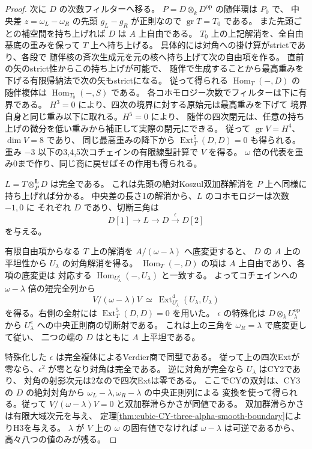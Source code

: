 \begin{proof}
次に $D$ の次数フィルターへ移る。
$P=D\otimes_k D^{\mathrm{op}}$ の随伴環は $P_0$ で、
中央差 $z=\omega_L-\omega_R$ の先頭 $g_L-g_R$ が正則なので
$\operatorname{gr}T=T_0$ である。
また先頭ごとの補空間を持ち上げれば $D$ は $A$ 上自由である。
$T_0$ 上の上記解消を、全自由基底の重みを保って $T$ 上へ持ち上げる。
具体的には対角への掛け算がstrictであり、各段で
随伴核の斉次生成元を元の核へ持ち上げて次の自由項を作る。
直前の矢のstrict性からこの持ち上げが可能で、
随伴で生成することから最高重みを下げる有限帰納法で次の矢もstrictになる。
従って得られる $\operatorname{Hom}_T(-,D)$ の随伴複体は
$\operatorname{Hom}_{T_0}(-,S)$ である。
各コホモロジー次数でフィルターは下に有界である。
$H^3=0$ により、四次の境界に対する原始元は最高重みを下げて
境界自身と同じ重み以下に取れる。$H^5=0$ により、
随伴の四次閉元は、任意の持ち上げの微分を低い重みから補正して実際の閉元にできる。
従って $\operatorname{gr}V=H^4$、$\dim V=8$ であり、
同じ最高重みの降下から $\operatorname{Ext}^5_T(D,D)=0$ も得られる。
重み $-3$ 以下の3,4,5次コチェインの有限線型計算で $V$ を得る。
$\omega$ 倍の代表を重み0まで作り、同じ商に戻せばその作用も得られる。

$L=T\otimes_P^{\mathbf L} D$ は完全である。
これは先頭の絶対Koszul双加群解消を $P$ 上へ同様に持ち上げれば分かる。
中央差の長さ1の解消から、$L$ のコホモロジーは次数 $-1,0$ に
それぞれ $D$ であり、切断三角は
\[
 D[1]\longrightarrow L\longrightarrow D\xrightarrow{\epsilon}D[2]
\]
を与える。

有限自由項からなる $T$ 上の解消を $A/(\omega-\lambda)$ へ底変更すると、
$D$ の $A$ 上の平坦性から $U_\lambda$ の対角解消を得る。
$\operatorname{Hom}_T(-,D)$ の項は $A$ 上自由であり、各項の底変更は
対応する $\operatorname{Hom}_{U_\lambda^e}(-,U_\lambda)$ と一致する。
よってコチェインへの $\omega-\lambda$ 倍の短完全列から
\[
 V/(\omega-\lambda)V
 \ \simeq\ \operatorname{Ext}^4_{U_\lambda^e}(U_\lambda,U_\lambda)
\]
を得る。右側の全射には $\operatorname{Ext}^5_T(D,D)=0$ を用いた。
$\epsilon$ の特殊化は $D\otimes_k U_\lambda^{\mathrm{op}}$ から
$U_\lambda^e$ への中央正則商の切断射である。
これは上の三角を $\omega_R=\lambda$ で底変更して従い、
二つの端の $D$ はともに $A$ 上平坦である。

特殊化した $\epsilon$ は完全複体によるVerdier商で同型である。
従って上の四次Extが零なら、$\epsilon^2$ が零となり対角は完全である。
逆に対角が完全なら $U_\lambda$ はCY2であり、
対角の射影次元は2なので四次Extは零である。
ここでCYの双対は、CY3の $D$ の絶対対角から
$\omega_L-\lambda,\omega_R-\lambda$ の中央正則列による
変換を使って得られる。従って $V/(\omega-\lambda)V=0$ と双加群滑らかさが同値である。
双加群滑らかさは有限大域次元を与え、
定理\ref{thm:cubic-CY-three-alpha-smooth-boundary}によりH3を与える。
$\lambda$ が $V$ 上の $\omega$ の固有値でなければ
$\omega-\lambda$ は可逆であるから、高々八つの値のみが残る。
\end{proof}

